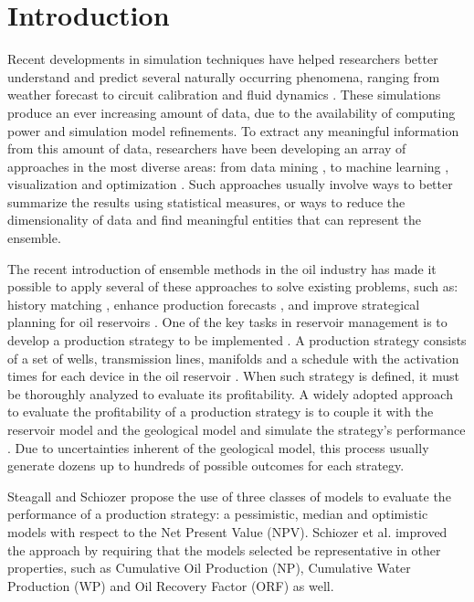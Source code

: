 \documentclass[final,5p,times,twocolumn]{elsarticle}
\begin{document}



\section{Introduction}
\label{sec:introduction}
Recent developments in simulation techniques have helped researchers better understand and predict several naturally occurring phenomena, ranging from weather forecast \cite{noodles-sanyal:2010} to circuit calibration \cite{lee:2010} and fluid dynamics \cite{hummel:2013}. These simulations produce an ever increasing amount of data, due to the availability of computing power and simulation model refinements. To extract any meaningful information from this amount of data, researchers have been developing an array of approaches in the most diverse areas: from data mining \cite{wang:2014}, to machine learning \cite{yang:2007}, visualization \cite{phadke:2012} and optimization \cite{alrefaei:2007}. Such approaches usually involve ways to better summarize the results using statistical measures, or ways to reduce the dimensionality of data and find meaningful entities that can represent the ensemble.

The recent introduction of ensemble methods in the oil industry has made it possible to apply several of these approaches to solve existing problems, such as: history matching \cite{aanonsen:2009}, enhance production forecasts \cite{wen:2005}, and improve strategical planning for oil reservoirs \cite{aanonsen:2009, chen:2009}. One of the key tasks in reservoir management is to develop a production strategy to be implemented \cite{schiozer:2004}. A production strategy consists of a set of wells, transmission lines, manifolds and a schedule with the activation times for each device in the oil reservoir \cite{meira:2016}. When such strategy is defined, it must be thoroughly analyzed to evaluate its profitability. A widely adopted approach to evaluate the profitability of a production strategy is to couple it with the reservoir model and the geological model and simulate the strategy's performance \cite{meira:2016}. Due to uncertainties inherent of the geological model, this process usually generate dozens up to hundreds of possible outcomes for each strategy.

Steagall and Schiozer \cite{steagall:2001} propose the use of three classes of models to evaluate the performance of a production strategy: a pessimistic, median and optimistic models with respect to the Net Present Value (NPV). Schiozer et al. \cite{schiozer:2004} improved the approach by requiring that the models selected be representative in other properties, such as Cumulative Oil Production (NP), Cumulative Water Production (WP) and Oil Recovery Factor (ORF) as well.
\end{document}
